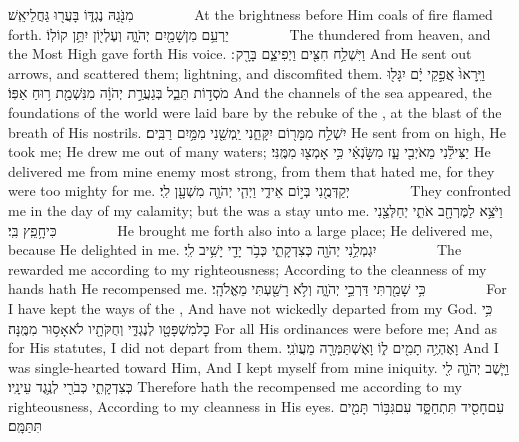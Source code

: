 {מִנֹּ֖גַהּ נֶגְדּ֑וֹ בָּעֲר֖וּ גַּחֲלֵי\maqqaf אֵֽשׁ׃        }
{At the brightness before Him coals of fire flamed forth.}
{יַרְעֵ֥ם מִן\maqqaf שָׁמַ֖יִם יְהֹוָ֑ה וְעֶלְי֖וֹן יִתֵּ֥ן קוֹלֽוֹ׃        }
{The \lord\space thundered from heaven, and the Most High gave forth His voice.}
{וַיִּשְׁלַ֥ח חִצִּ֖ים וַיְפִיצֵ֑ם בָּרָ֖ק ׃}
{And He sent out arrows, and scattered them; lightning, and discomfited them.}
{וַיֵּֽרָאוּ֙ אֲפִ֣קֵי יָ֔ם יִגָּל֖וּ מֹסְד֣וֹת תֵּבֵ֑ל בְּגַעֲרַ֣ת יְהֹוָ֔ה מִנִּשְׁמַ֖ת ר֥וּחַ אַפּֽוֹ׃}
{And the channels of the sea appeared, the foundations of the world were laid bare by the rebuke of the \lord, at the blast of the breath of His nostrils.}
{יִשְׁלַ֥ח מִמָּר֖וֹם יִקָּחֵ֑נִי יַֽמְשֵׁ֖נִי מִמַּ֥יִם רַבִּֽים׃}
{He sent from on high, He took me; He drew me out of many waters;}
{יַצִּילֵ֕נִי מֵאֹיְבִ֖י עָ֑ז מִשֹּׂ֣נְאַ֔י כִּ֥י אָמְצ֖וּ מִמֶּֽנִּי׃}
{He delivered me from mine enemy most strong, from them that hated me, for they were too mighty for me.}
{יְקַדְּמֻ֖נִי בְּי֣וֹם אֵידִ֑י וַיְהִ֧י יְהֹוָ֛ה מִשְׁעָ֖ן לִֽי׃        }
{They confronted me in the day of my calamity; but the \lord\space was a stay unto me.}
{וַיֹּצֵ֥א לַמֶּרְחָ֖ב אֹתִ֑י יְחַלְּצֵ֖נִי כִּי\maqqaf חָ֥פֵֽץ בִּֽי׃        }
{He brought me forth also into a large place; He delivered me, because He delighted in me.}
{יִגְמְלֵ֥נִי יְהֹוָ֖ה כְּצִדְקָתִ֑י כְּבֹ֥ר יָדַ֖י יָשִׁ֥יב לִֽי׃        }
{The \lord\space rewarded me according to my righteousness; According to the cleanness of my hands hath He recompensed me.}
{כִּ֥י שָׁמַ֖רְתִּי דַּרְכֵ֣י יְהֹוָ֑ה וְלֹ֥א רָשַׁ֖עְתִּי מֵאֱלֹהָֽי׃        }
{For I have kept the ways of the \lord, And have not wickedly departed from my God.}
{כִּ֥י כׇל\maqqaf מִשְׁפָּטָ֖ו לְנֶגְדִּ֑י וְחֻקֹּתָ֖יו לֹא\maqqaf אָס֥וּר מִמֶּֽנָּה׃}
{For all His ordinances were before me; And as for His statutes, I did not depart from them.}
{וָאֶהְיֶ֥ה תָמִ֖ים ל֑וֹ וָאֶשְׁתַּמְּרָ֖ה מֵעֲוֺנִֽי׃}
{And I was single-hearted toward Him, And I kept myself from mine iniquity.}
{וַיָּ֧שֶׁב יְהֹוָ֛ה לִ֖י כְּצִדְקָתִ֑י כְּבֹרִ֖י לְנֶ֥גֶד עֵינָֽיו׃}
{Therefore hath the \lord\space recompensed me according to my righteousness, According to my cleanness in His eyes.}
{עִם\maqqaf חָסִ֖יד תִּתְחַסָּ֑ד עִם\maqqaf גִּבּ֥וֹר תָּמִ֖ים תִּתַּמָּֽם׃}
